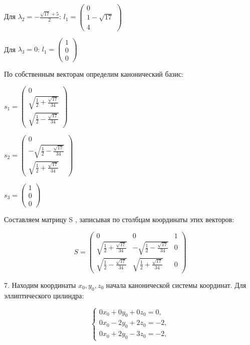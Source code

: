 Для $\lambda_2 = -\frac{\sqrt{17} + 5}{2}$: $l_1 = \begin{pmatrix}
	  0 \\
	  1-\sqrt{17} \\
	  4 
	\end{pmatrix}$

Для $\lambda_3 = 0$: $l_1 = \begin{pmatrix}
	  1 \\
	  0 \\
	  0 
	\end{pmatrix}$

По собственным векторам определим канонический базис:

$s_1 = \begin{pmatrix}
	  0 \\
	  \sqrt{\frac{1}{2}+\frac{\sqrt{17}}{34}} \\
	  \sqrt{\frac{1}{2}-\frac{\sqrt{17}}{34}}
	\end{pmatrix}$

$s_2 = \begin{pmatrix}
	  0 \\
	  -\sqrt{\frac{1}{2}-\frac{\sqrt{17}}{34}} \\
	  \sqrt{\frac{1}{2}+\frac{\sqrt{17}}{34}}
	\end{pmatrix}$

$s_3 = \begin{pmatrix}
	  1 \\
	  0 \\
	  0
	\end{pmatrix}$

Составляем матрицу S , записывая по столбцам координаты этих векторов:

\begin{center}
	\begin{equation*}
	S = 
	\begin{pmatrix}
	  0 & 0 & 1\\
	  \sqrt{\frac{1}{2}+\frac{\sqrt{17}}{34}} & -\sqrt{\frac{1}{2}-\frac{\sqrt{17}}{34}} & 0\\
	  \sqrt{\frac{1}{2}-\frac{\sqrt{17}}{34}} & \sqrt{\frac{1}{2}+\frac{\sqrt{17}}{34}} & 0
	\end{pmatrix}
	\end{equation*}
\end{center}

7. Находим координаты $x_0, y_0, z_0$ начала канонической
системы координат. Для эллиптического цилиндра:

\begin{equation*}
 \begin{cases}
   0x_0 + 0y_0 + 0z_0 = 0, 
   \\
   0x_0 - 2y_0 + 2z_0 = -2, 
   \\
   0x_0 + 2y_0 - 3z_0 = -2, 
 \end{cases}
\end{equation*}

